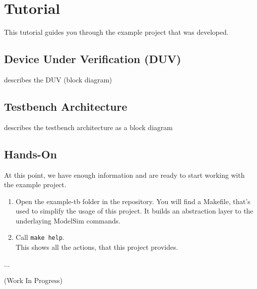 \section{Tutorial}

This tutorial guides you through the example project that was developed.

\subsection{Device Under Verification (DUV)}

describes the DUV (block diagram)

\subsection{Testbench Architecture}

describes the testbench architecture as a block diagram

\subsection{Hands-On}

At this point, we have enough information and are ready to start working with the example project.

\begin{enumerate}
  \item Open the example-tb folder in the repository.
        You will find a Makefile, that's used to simplify the usage of this project. It builds an abstraction layer to the underlaying ModelSim commands.
  \item Call \texttt{make help}. \\
        This shows all the actions, that this project provides.
\end{enumerate}

...

(Work In Progress)
